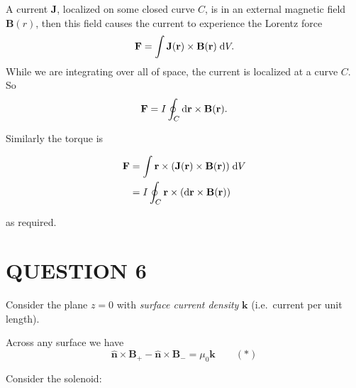 \documentclass[a4paper]{article}
\begin{document}
 A current $\mathbf{J}$, localized on some closed curve $C$, is in an external magnetic field $ \mathbf{B}(r) $, then this field causes the current to experience the Lorentz force
\[
\mathbf{F} = \int \mathbf{J}(\mathbf{r})\times \mathbf{B}(\mathbf{r})\;\mathrm{d} V.
\]
While we are integrating over all of space, the current is localized at a curve $C$. So
\[
\mathbf{F} = I\oint_{C} \mathrm{d} \mathbf{r} \times \mathbf{B}(\mathbf{r}).
\]


Similarly the torque is


\begin{align*}
\mathbf{F} & = \int  \mathbf{r} \times (\mathbf{J}(\mathbf{r})\times \mathbf{B}(\mathbf{r}))    \;\mathrm{d} V \\
& = I\oint_{C} \mathbf{r} \times (\mathrm{d} \mathbf{r} \times \mathbf{B}(\mathbf{r}))
\end{align*}



as required. 

\section{QUESTION 6}

Consider the plane $z = 0$ with \emph{surface current density} $\mathbf{k}$ (i.e.\ current per unit length).
\begin{center}
\end{center}


Across any surface we have
\[
\hat {\mathbf{n}} \times \mathbf{B}_+ - \hat{\mathbf{n}}\times \mathbf{B}_{-} = \mu_0 \mathbf{k} \qquad (*)
\]


Consider the solenoid:
\end{document}
